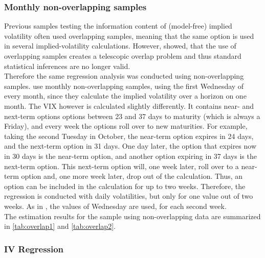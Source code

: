 \subsubsection{Monthly non-overlapping samples}
Previous samples testing the information content of (model-free) implied volatility often used overlapping samples, meaning that the same option is used in several implied-volatility calculations. However, \textcite{christensen1998} showed, that the use of overlapping samples creates a telescopic overlap problem and thus standard statistical inferences are no longer valid.\\
Therefore the same regression analysis was conducted using non-overlapping samples. \textcite{jiang2003} use monthly non-overlapping samples, using the first Wednesday of every month, since they calculate the implied volatility over a horizon on one month. The VIX however is calculated slightly differently. It contains near- and next-term options options between 23 and 37 days to maturity (which is always a Friday), and every week the options roll over to new maturities. For example, taking the second Tuesday in October, the near-term option expires in 24 days, and the next-term option in 31 days. One day later, the option that expires now in 30 days is the near-term option, and another option expiring in 37 days is the next-term option. This next-term option will, one week later, roll over to a near-term option and, one more week later, drop out of the calculation. Thus, an option can be included in the calculation for up to two weeks. Therefore, the regression is conducted with daily volatilities, but only for one value out of two weeks. As in \textcite{jiang2003}, the values of Wednesday are used, for each second week. \\
The estimation results for the sample using non-overlapping data are summarized in \ref{tab:overlap1} and \ref{tab:overlap2}.

\label{tab:overlap1}
%
\label{tab:overlap2}
%


\subsubsection{IV Regression}
















